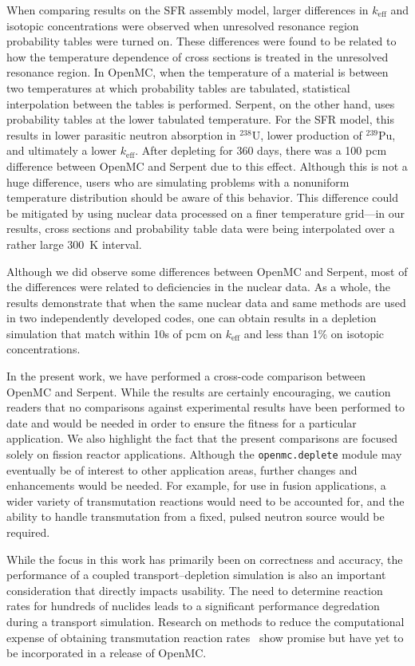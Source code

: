\documentclass[3p,authoryear]{elsarticle}
\begin{document}
When comparing results on the SFR assembly model, larger differences in
$k_\text{eff}$ and isotopic concentrations were observed when unresolved
resonance region probability tables were turned on. These differences were found
to be related to how the temperature dependence of cross sections is treated in
the unresolved resonance region. In OpenMC, when the temperature of a material
is between two temperatures at which probability tables are tabulated,
statistical interpolation between the tables is performed. Serpent, on the other
hand, uses probability tables at the lower tabulated temperature. For the SFR
model, this results in lower parasitic neutron absorption in $^{238}$U, lower
production of $^{239}$Pu, and ultimately a lower $k_\text{eff}$. After depleting
for 360 days, there was a 100 pcm difference between OpenMC and Serpent due to
this effect. Although this is not a huge difference, users who are simulating
problems with a nonuniform temperature distribution should be aware of this
behavior. This difference could be mitigated by using nuclear data processed on
a finer temperature grid---in our results, cross sections and probability table
data were being interpolated over a rather large \SI{300}{\kelvin} interval.

Although we did observe some differences between OpenMC and Serpent, most of the
differences were related to deficiencies in the nuclear data. As a whole, the
results demonstrate that when the same nuclear data and same methods are used in
two independently developed codes, one can obtain results in a depletion
simulation that match within 10s of pcm on $k_\text{eff}$ and less than 1\% on
isotopic concentrations.

In the present work, we have performed a cross-code comparison between OpenMC
and Serpent. While the results are certainly encouraging, we caution readers
that no comparisons against experimental results have been performed to date and
would be needed in order to ensure the fitness for a particular application. We
also highlight the fact that the present comparisons are focused solely on
fission reactor applications. Although the \texttt{openmc.deplete} module may
eventually be of interest to other application areas, further changes and
enhancements would be needed. For example, for use in fusion applications, a
wider variety of transmutation reactions would need to be accounted for, and the
ability to handle transmutation from a fixed, pulsed neutron source would be
required.

While the focus in this work has primarily been on correctness and accuracy, the
performance of a coupled transport--depletion simulation is also an important
consideration that directly impacts usability. The need to determine reaction
rates for hundreds of nuclides leads to a significant performance degredation
during a transport simulation. Research on methods to reduce the computational
expense of obtaining transmutation reaction rates~\citep{salcedoperez2019mc}
show promise but have yet to be incorporated in a release of OpenMC.
\end{document}
